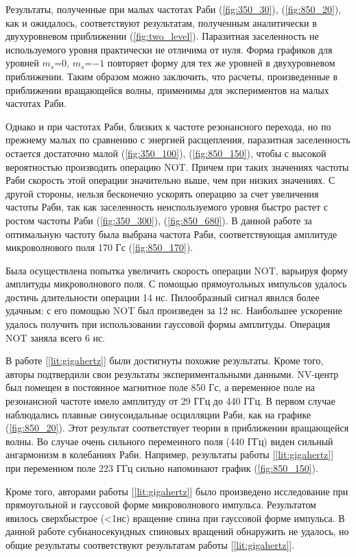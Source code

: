 \newpage
{}

Результаты, полученные при малых частотах Раби (\ref{fig:350_30}), (\ref{fig:850_20}), как и ожидалось,
соответствуют результатам, полученным аналитически в двухуровневом
приближении (\ref{fig:two_level}). Паразитная заселенность не
используемого уровня практически не отличима от нуля. Форма графиков
для уровней $m_s$=$0$, $m_s$=$-1$ повторяет форму для тех же уровней в
двухуровневом приближении. Таким образом можно заключить, что расчеты, произведенные
в приближении вращающейся волны, применимы для экспериментов на малых
частотах Раби.

Однако и при частотах Раби, близких к частоте резонансного перехода, но
по прежнему малых по сравнению с энергией расщепления, паразитная
заселенность остается достаточно малой (\ref{fig:350_100}), (\ref{fig:850_150}), чтобы с высокой вероятностью
производить операцию NOT. Причем при таких значениях частоты Раби
скорость этой операции значительно выше, чем при низких значениях. С
другой стороны, нельзя бесконечно ускорять операцию за счет увеличения
частоты Раби, так как заселенность неиспользуемого уровня быстро
растет с ростом частоты Раби (\ref{fig:350_300}),
(\ref{fig:850_680}). В данной работе за оптимальную частоту была
выбрана частота Раби, соответствующая амплитуде микроволнового поля
170 Гс (\ref{fig:850_170}).

Была осуществлена попытка увеличить скорость операции NOT, варьируя
форму амплитуды микроволнового поля. С помощью прямоугольных импульсов
удалось достичь длительности операции 14 нс. Пилообразный сигнал
явился более удачным: с его помощью NOT был произведен за 12
нс. Наибольшее ускорение удалось получить при использовании гауссовой
формы амплитуды. Операция NOT заняла всего 6 нс.

В работе [\ref{lit:gigahertz}] были достигнуты похожие
результаты. Кроме того, авторы подтвердили свои результаты
экспериментальными данными. NV-центр был помещен в постоянное
магнитное поле 850 Гс, а переменное поле на резонансной частоте
имело амплитуду от 29 ГГц до 440 ГГц. В первом случае наблюдались
плавные синусоидальные осцилляции Раби, как на графике
(\ref{fig:850_20}). Этот результат соответствует теории в приближении
вращающейся волны. Во случае очень сильного переменного поля (440 ГГц)
виден сильный ангармонизм в колебаниях Раби. Например, результаты
работы [\ref{lit:gigahertz}] при переменном поле 223 ГГц сильно
напоминают график (\ref{fig:850_150}).

Кроме того, авторами работы [\ref{lit:gigahertz}] было произведено
исследование при прямоугольной и гауссовой форме микроволнового
импульса. Результатом явилось сверхбыстрое (<1нс) вращение спина при
гауссовой форме импульса. В данной работе субнаносекундных спиновых
вращений обнаружить не удалось, но общие результаты соответствуют
результатам работы [\ref{lit:gigahertz}].

